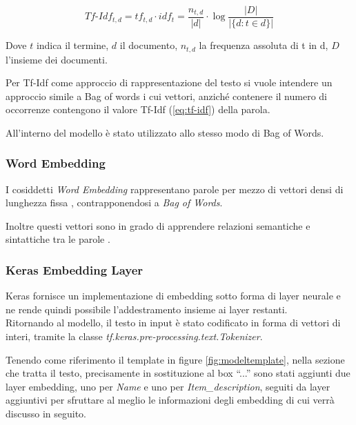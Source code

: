 \begin{equation}
	\label{eq:tf-idf}
	Tf\mbox{-}Idf_{t,d}
	=
	tf_{t,d} \cdot idf_t
	=
	\frac{n_{t,d}}{|d|} \cdot \log \frac{|D|}{|\{d: t \in d\}|}
\end{equation}

Dove $t$ indica il termine, $d$ il documento, $n_{t,d}$ la frequenza assoluta di
t in d, $D$ l'insieme dei documenti.

Per Tf-Idf come approccio di rappresentazione del testo si vuole intendere un
approccio simile a Bag of words i cui vettori, anziché contenere il
numero di occorrenze contengono il valore Tf-Idf (\ref{eq:tf-idf}) della parola.

All'interno del modello è stato utilizzato allo stesso modo di Bag
of Words.

\subsubsection{Word Embedding}

I cosiddetti \textit{Word Embedding} rappresentano parole per mezzo di vettori
densi di lunghezza fissa \cite{almeida2019word}, contrapponendosi a  \textit{Bag
	of Words}.

Inoltre questi vettori sono in grado di apprendere relazioni semantiche e
sintattiche tra le parole \cite{mikolov2013efficient}.

\subsubsection{Keras Embedding Layer}

Keras fornisce un implementazione di embedding sotto forma di layer neurale e
ne rende quindi possibile l'addestramento insieme ai layer restanti.
\\
Ritornando al modello, il testo in input è stato codificato in forma di
vettori di interi, tramite la classe \textit{tf.keras.pre-processing.\-text.Tokenizer}.

Tenendo come riferimento il template in figure
\ref{fig:modeltemplate}, nella sezione che tratta il testo, precisamente in
sostituzione al box ``...'' sono stati aggiunti due layer embedding, uno per
\textit{Name} e uno per \textit{Item\_description}, seguiti da layer aggiuntivi
per sfruttare al meglio le informazioni degli embedding di cui verrà discusso in
seguito.

